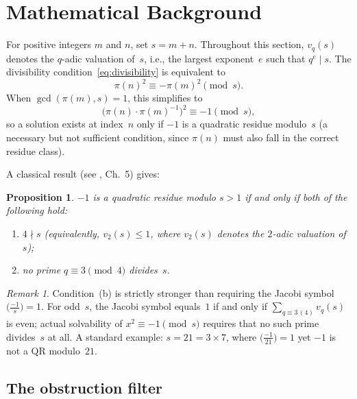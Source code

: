 \documentclass[11pt]{article}
\newtheorem{proposition}{Proposition}
\theoremstyle{definition}
\theoremstyle{remark}
\newtheorem{remark}{Remark}
\numberwithin{equation}{section}
\newcommand{\vq}[1]{v_{#1}}
\begin{document}
\section{Mathematical Background}
\label{sec:background}

For positive integers $m$ and $n$, set $s = m + n$.
Throughout this section, $\vq{q}(s)$ denotes the $q$-adic
valuation of~$s$, i.e., the largest exponent~$e$ such that
$q^e \mid s$.
The divisibility condition~\eqref{eq:divisibility} is equivalent to
\begin{equation}\label{eq:modular}
\pi(n)^2 \equiv -\pi(m)^2 \pmod{s}.
\end{equation}
When $\gcd(\pi(m), s) = 1$, this simplifies to
\begin{equation}\label{eq:qr}
\bigl(\pi(n) \cdot \pi(m)^{-1}\bigr)^2 \equiv -1 \pmod{s},
\end{equation}
so a solution exists at index~$n$ only if $-1$ is a quadratic
residue modulo~$s$ (a necessary but not sufficient condition, since
$\pi(n)$ must also fall in the correct residue class).

A classical result (see \cite{IrelandRosen}, Ch.~5) gives:

\begin{proposition}\label{prop:qr}
$-1$ is a quadratic residue modulo $s > 1$ if and only if both
of the following hold:
\begin{enumerate}
\item[\textup{(a)}] $4 \nmid s$
\textup{(}equivalently, $\vq{2}(s) \le 1$,
where $\vq{2}(s)$ denotes the $2$-adic valuation of~$s$\textup{)};
\item[\textup{(b)}] no prime $q \equiv 3 \pmod{4}$ divides~$s$.
\end{enumerate}
\end{proposition}

\begin{remark}\label{rem:jacobi}
Condition~(b) is strictly stronger than requiring the Jacobi
symbol $\bigl(\frac{-1}{s}\bigr) = 1$.
For odd~$s$, the Jacobi symbol equals~$1$ if and only if
$\sum_{q \equiv 3\,(4)} \vq{q}(s)$ is even; actual solvability of
$x^2 \equiv -1 \pmod{s}$ requires that no such prime divides~$s$
at all.
A standard example: $s = 21 = 3 \times 7$, where
$\bigl(\frac{-1}{21}\bigr) = 1$ yet $-1$ is not a QR modulo~$21$.
\end{remark}

\subsection{The obstruction filter}
\end{document}
